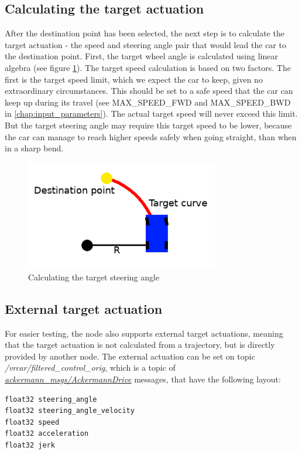 \subsection{Calculating the target actuation}
After the destination point has been selected, the next step is to calculate the target actuation - the speed and steering angle pair that would lead the car to the destination point. First, the target wheel angle is calculated using linear algebra (see figure \ref{calc_steering_angle}). The target speed calculation is based on two factors. The first is the target speed limit, which we expect the car to keep, given no extraordinary circumstances. This should be set to a safe speed that the car can keep up during its travel (see MAX\_SPEED\_FWD and MAX\_SPEED\_BWD in \ref{chap:input_parameters}). The actual target speed will never exceed this limit. But the target steering angle may require this target speed to be lower, because the car can manage to reach higher speeds safely when going straight, than when in a sharp bend.

\begin{figure}[!ht]
    \centering
    \includegraphics[height=48mm]{figures/raw/calc_steering_angle.png}
    \caption{Calculating the target steering angle}
    \label{calc_steering_angle}
\end{figure}

\subsection{External target actuation}
For easier testing, the node also supports external target actuations, meaning that the target actuation is not calculated from a trajectory, but is directly provided by another node. The external actuation can be set on topic \textit{/vrcar/filtered\_control\_orig}, which is a topic of \href{http://docs.ros.org/jade/api/ackermann_msgs/html/msg/AckermannDrive.html}{\textit{ackermann\_msgs/AckermannDrive}} messages, that have the following layout:

\begin{minipage}{\textwidth}
\begin{lstlisting}[language=IDL]
float32 steering_angle
float32 steering_angle_velocity
float32 speed
float32 acceleration
float32 jerk
\end{lstlisting}
\end{minipage}

